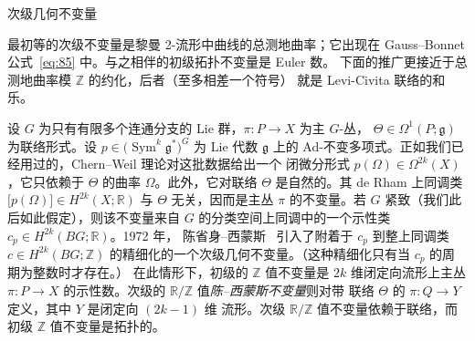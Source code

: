 \documentclass[11pt]{amsart}
\makeatletter
\def\subsection{\@startsection{subsection}{2}%
   \z@{1.25\linespacing\@plus.7\linespacing}{.5\linespacing}%
   {\normalfont\bfseries}}
\theoremstyle{definition}
\theoremstyle{remark}
\theoremstyle{plain}
\numberwithin{equation}{section}
\renewcommand{\:}{\colon}
\newcommand{\RR}{{\mathbb R}}
\newcommand{\ZZ}{{\mathbb Z}}
\DeclareMathOperator{\Sym}{Sym}
\newcommand{\RZ}{\RR/\ZZ}
\makeatother
\begin{document}
  \subsection{次级几何不变量}\label{subsec:7.4}

最初等的次级不变量是黎曼 2-流形中曲线的总测地曲率；它出现在
Gauss–Bonnet 公式~\eqref{eq:85} 中。与之相伴的初级拓扑不变量是 Euler 数。
下面的推广更接近于总测地曲率模 $\ZZ$ 的约化，后者（至多相差一个符号）
就是 Levi-Civita 联络的和乐。

设 $G$ 为只有有限多个连通分支的 Lie 群，$\pi \:P\to X$ 为主 $G$-丛，
$\Theta \in \Omega ^1(P;\mathfrak{g})$ 为联络形式。设
$p\in \bigl(\Sym^k\mathfrak{g}^* \bigr)^G$ 为 Lie 代数 $\mathfrak{g}$ 上的
Ad-不变多项式。正如我们已经用过的，Chern–Weil 理论对这批数据给出一个
闭微分形式 $p(\Omega )\in \Omega ^{2k}(X)$，它只依赖于 $\Theta $ 的曲率
$\Omega $。此外，它对联络 $\Theta $ 是自然的。其 de Rham 上同调类
$\bigl[p(\Omega )\bigr]\in H^{2k}(X;\RR)$ 与 $\Theta $ 无关，因而是主丛
$\pi $ 的不变量。若 $G$ 紧致（我们此后如此假定），则该不变量来自 $G$
的分类空间上同调中的一个示性类 $c_p\in H^{2k}(BG;\RR)$。1972 年，
陈省身–西蒙斯~\cite{CS} 引入了附着于 $c_p$ 到整上同调类
$c\in H^{2k}(BG;\ZZ)$ 的精细化的一个次级几何不变量。（这种精细化只有当
$c_p$ 的周期为整数时才存在。）
在此情形下，初级的 $\ZZ$ 值不变量是 $2k$ 维闭定向流形上主丛
$\pi \:P\to X$ 的示性数。次级的 $\RZ$ 值\emph{陈–西蒙斯不变量}则对带
联络 $\Theta $ 的 $\pi \:Q\to Y$ 定义，其中 $Y$ 是闭定向 $(2k-1)$ 维
流形。次级 $\RZ$ 值不变量依赖于联络，而初级 $\ZZ$ 值不变量是拓扑的。
\end{document}
